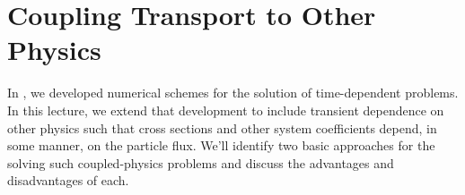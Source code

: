\chapter{Coupling Transport to Other Physics}

In , we developed numerical 
schemes for the solution of time-dependent problems.  In this 
lecture, we extend that development to include transient dependence
on other physics such that cross sections and other system 
coefficients depend, in some manner, on the particle flux.  We'll 
identify two basic approaches for the solving such coupled-physics 
problems and discuss the advantages and disadvantages of each.

